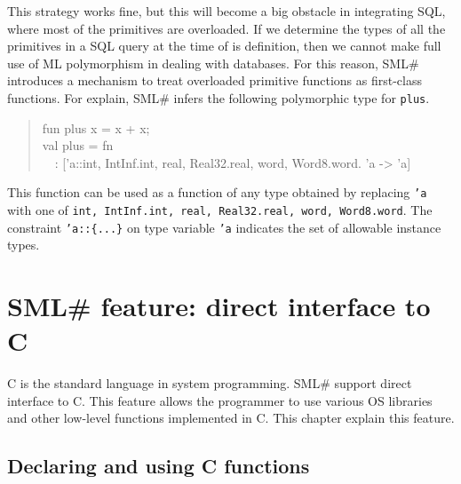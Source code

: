 \documentclass{jbook}
\newif\ifjp
\newcommand{\txt}[2]{#2}
\newcommand{\smlsharp}{SML\#}
\newcommand{\myem}{\mbox{\ \ }}
\begin{document}
	This strategy works fine, but this will become a big obstacle in
integrating SQL, where most of the primitives are overloaded.
	If we determine the types of all the primitives in a SQL query
at the time of is definition, then we cannot make full use of ML
polymorphism in dealing with databases.
	For this reason, \smlsharp{} introduces a mechanism to treat
overloaded primitive functions as first-class functions.
	For explain, \smlsharp{} infers the following polymorphic type
for {\tt plus}.
\begin{tt}
\begin{quote}
fun plus x = x + x;\\
val plus = fn\\
\myem  : ['a::{int, IntInf.int, real, Real32.real, word, Word8.word}. 'a -> 'a]
\end{quote}
\end{tt}
	This function can be used as a function of any type obtained by
replacing {\tt 'a} with one of {\tt int, IntInf.int, real,
Real32.real, word, Word8.word}.
	The constraint {\tt 'a::\{...\}} on type variable {\tt 'a}
indicates the set of allowable instance types.
\fi%


\chapter{
\txt{\smlsharp{}の拡張機能：Cとの直接連携}
    {\smlsharp{} feature: direct interface to C}
}
\label{chap:tutorialCFFI}

\ifjp%
	\smlsharp{}は，C言語とのシームレスな直接連携をサポートしています．
	C言語は事実上のシステム記述言語です．
	OSが提供するシステムサービスなども，C言語のインターフェイスとし
て提供されています．
	\smlsharp{}では，これら機能を，特別なライブラリなどを開発するこ
となく直接利用することができます．
	本節では，その利用方法を学びます．
\else%
	C is the standard language in system programming.
	\smlsharp{} support direct interface to C.
	This feature allows the programmer to use various OS libraries
and other low-level functions implemented in C.
	This chapter explain this feature.
\fi%

\section{\txt{C関数の使用の宣言}{Declaring and using C functions}}
\label{sec:extensionCdecl}
\end{document}
